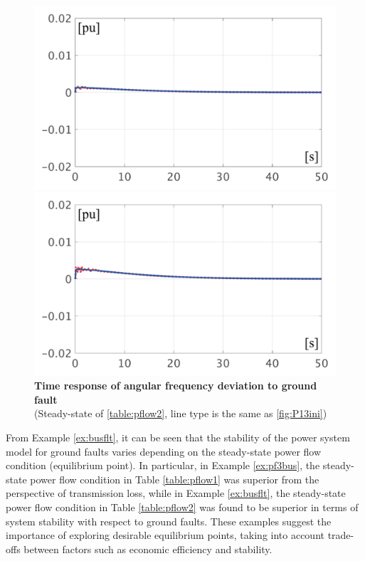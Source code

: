 \documentclass[graybox, envcountchap]{svmult}
\begin{document}
\begin{figure}[t]
  \centering
  {
  \begin{minipage}{0.49\linewidth}
    \centering
    \includegraphics[width = 1.0\linewidth]{figs/50mP3}
  \end{minipage}
  \begin{minipage}{0.49\linewidth}
    \centering
    \includegraphics[width = 1.0\linewidth]{figs/100mP3}
  \end{minipage}
  \medskip
  \caption{\textbf{Time response of angular frequency deviation to ground fault}
  \\ \centering (Steady-state of \ref{table:pflow2}, line type is the same as \ref{fig:P13ini})}
  \label{fig:P3fault}
  }
\medskip
\end{figure}

From Example \ref{ex:busflt}, it can be seen that the stability of the power
system model for ground faults varies depending on the steady-state power flow
condition (equilibrium point). In particular, in Example \ref{ex:pf3bus}, the
steady-state power flow condition in Table \ref{table:pflow1} was superior from
the perspective of transmission loss, while in Example \ref{ex:busflt}, the
steady-state power flow condition in Table \ref{table:pflow2} was found to be
superior in terms of system stability with respect to ground faults. These
examples suggest the importance of exploring desirable equilibrium points,
taking into account trade-offs between factors such as economic efficiency and
stability.
\end{document}

